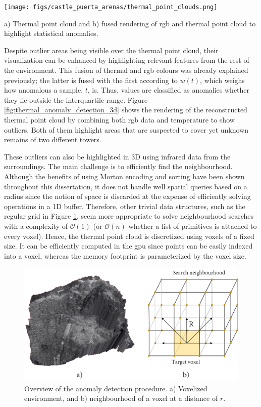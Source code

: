 \begin{marginfigure}[.2cm]
    \centering
    \texttt{[image: figs/castle\_puerta\_arenas/thermal\_point\_clouds.png]}
	\caption{a) Thermal point cloud and b) fused rendering of \acrshort{rgb} and thermal point cloud to highlight statistical anomalies.}
	\label{fig:thermal_anomaly_detection_3d}
\end{marginfigure}
Despite outlier areas being visible over the thermal point cloud, their visualization can be enhanced by highlighting relevant features from the rest of the environment. This fusion of thermal and \acrshort{rgb} colours was already explained previously; the latter is fused with the first according to $w(t)$, which weighs how anomalous a sample, $t$, is. Thus, values are classified as anomalies whether they lie outside the interquartile range. Figure \ref{fig:thermal_anomaly_detection_3d} shows the rendering of the reconstructed thermal point cloud by combining both \acrshort{rgb} data and temperature to show outliers. Both of them highlight areas that are suspected to cover yet unknown remains of two different towers. 

These outliers can also be highlighted in 3D using infrared data from the surroundings. The main challenge is to efficiently find the neighbourhood. Although the benefits of using Morton encoding and sorting have been shown throughout this dissertation, it does not handle well spatial queries based on a radius since the notion of space is discarded at the expense of efficiently solving operations in a 1D buffer. Therefore, other trivial data structures, such as the regular grid in Figure \ref{fig:voxel_anomalies_scheme}, seem more appropriate to solve neighbourhood searches with a complexity of $\mathcal{O}(1)$ (or $\mathcal{O}(n)$ whether a list of primitives is attached to every voxel). Hence, the thermal point cloud is discretized using voxels of a fixed size. It can be efficiently computed in the \acrshort{gpu} since points can be easily indexed into a voxel, whereas the memory footprint is parameterized by the voxel size.

\begin{figure}[ht]
    \centering
    \includegraphics[width=\linewidth]{figs/castle_puerta_arenas/voxel_anomalies.png}
	\caption{Overview of the anomaly detection procedure. a) Voxelized environment, and b) neighbourhood of a voxel at a distance of $r$.}
	\label{fig:voxel_anomalies_scheme}
\end{figure}

